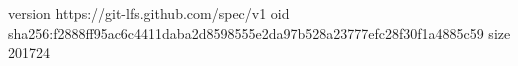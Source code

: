 version https://git-lfs.github.com/spec/v1
oid sha256:f2888ff95ac6c4411daba2d8598555e2da97b528a23777efc28f30f1a4885c59
size 201724

